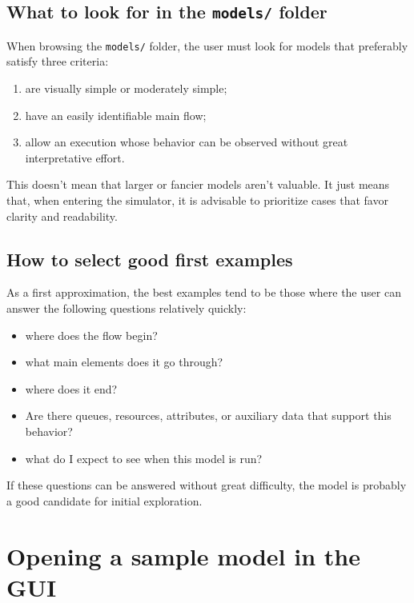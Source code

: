 \subsection{What to look for in the \texttt{models/} folder}
\label{subsec:cap4_o_que_procurar_models}

When browsing the \texttt{models/} folder, the user must look for models that preferably satisfy three criteria:

\begin{enumerate}
\item are visually simple or moderately simple;
\item have an easily identifiable main flow;
\item allow an execution whose behavior can be observed without great interpretative effort.
\end{enumerate}

This doesn't mean that larger or fancier models aren't valuable. It just means that, when entering the simulator, it is advisable to prioritize cases that favor clarity and readability.

\subsection{How to select good first examples}
\label{subsec:cap4_como_selecionar_bons_exemplos}

As a first approximation, the best examples tend to be those where the user can answer the following questions relatively quickly:
\begin{itemize}
\item where does the flow begin?
\item what main elements does it go through?
\item where does it end?
\item Are there queues, resources, attributes, or auxiliary data that support this behavior?
\item what do I expect to see when this model is run?
\end{itemize}

If these questions can be answered without great difficulty, the model is probably a good candidate for initial exploration.

\section{Opening a sample model in the GUI}
\label{sec:cap4_abrindo_modelo_exemplo}

